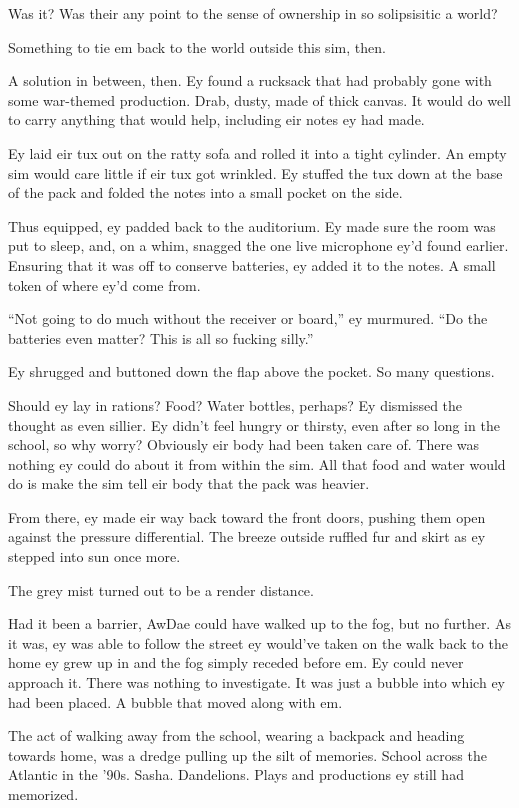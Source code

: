 Was it? Was their any point to the sense of ownership in so solipsisitic a world?

Something to tie em back to the world outside this sim, then.

A solution in between, then. Ey found a rucksack that had probably gone with some war-themed production. Drab, dusty, made of thick canvas. It would do well to carry anything that would help, including eir notes ey had made.

Ey laid eir tux out on the ratty sofa and rolled it into a tight cylinder. An empty sim would care little if eir tux got wrinkled. Ey stuffed the tux down at the base of the pack and folded the notes into a small pocket on the side.

Thus equipped, ey padded back to the auditorium. Ey made sure the room was put to sleep, and, on a whim, snagged the one live microphone ey'd found earlier. Ensuring that it was off to conserve batteries, ey added it to the notes. A small token of where ey'd come from.

``Not going to do much without the receiver or board,'' ey murmured. ``Do the batteries even matter? This is all so fucking silly.''

Ey shrugged and buttoned down the flap above the pocket. So many questions.

Should ey lay in rations? Food? Water bottles, perhaps? Ey dismissed the thought as even sillier. Ey didn't feel hungry or thirsty, even after so long in the school, so why worry? Obviously eir body had been taken care of. There was nothing ey could do about it from within the sim. All that food and water would do is make the sim tell eir body that the pack was heavier.

From there, ey made eir way back toward the front doors, pushing them open against the pressure differential. The breeze outside ruffled fur and skirt as ey stepped into sun once more.

The grey mist turned out to be a render distance.

Had it been a barrier, AwDae could have walked up to the fog, but no further. As it was, ey was able to follow the street ey would've taken on the walk back to the home ey grew up in and the fog simply receded before em. Ey could never approach it. There was nothing to investigate. It was just a bubble into which ey had been placed. A bubble that moved along with em.

The act of walking away from the school, wearing a backpack and heading towards home, was a dredge pulling up the silt of memories. School across the Atlantic in the '90s. Sasha. Dandelions. Plays and productions ey still had memorized.

